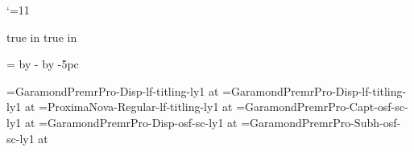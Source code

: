 \catcode`\@=11
%
%

\newdimen\textblock@top
\newdimen\textblock@odd@left
\newdimen\textblock@even@left

\def\settextblockposition#1#2{%
  \textblock@odd@left=#1
  \textblock@even@left=\pdfpagewidth
    \advance\textblock@even@left by -\hsize
    \advance\textblock@even@left by -#1
  \textblock@top=#2
}

\pdfhorigin=0pt
\pdfvorigin=0pt
 true in
 true in
\hsize=22pc
\vsize=39pc

\settextblockposition{5pc}{4.5pc}

%
%

\newif\if@cleared@page
\newif\if@display@page

\def\facingpages{%
  \if@cleared@page\headline={\line{}}\footline={\line{}}\fi%
  \if@display@page\headline={\line{}}\footline={\displaypagefootline}\fi%
  \global\@cleared@pagefalse%
  \global\@display@pagefalse%
  \dimen0=\ifodd\pageno\textblock@odd@left\else\textblock@even@left\fi%
  \shipout\vbox{\moveright\dimen0\vbox{\vskip\textblock@top\makeheadline\pagebody\makefootline}}%
  \advancepageno%
  \ifnum\outputpenalty>-20000 \else\dosupereject\fi%
}
\output{\facingpages}

%
%


\newdimen\booktitlesize \booktitlesize=36pt
\newdimen\aheadsize \aheadsize=24pt
\newdimen\bheadsize \bheadsize=18pt
\newdimen\textsize \textsize=11pt
\newdimen\smalltextsize \smalltextsize=10pt
\newdimen\runningheadersize \runningheadersize=8pt

\font\booktitlefont=GaramondPremrPro-Disp-lf-titling-ly1 at \booktitlesize
\font\authornamefont=GaramondPremrPro-Disp-lf-titling-ly1 at \aheadsize
\font\logofont=ProximaNova-Regular-lf-titling-ly1 at \bheadsize
\font\runningheaderfont=GaramondPremrPro-Capt-osf-sc-ly1 at \runningheadersize
\font\parttitlefont=GaramondPremrPro-Disp-osf-sc-ly1  at \aheadsize
\font\chaptertitlefont=GaramondPremrPro-Subh-osf-sc-ly1  at \bheadsize

